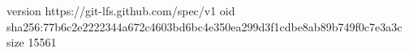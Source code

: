 version https://git-lfs.github.com/spec/v1
oid sha256:77b6c2e2222344a672c4603bd6bc4e350ea299d3f1cdbe8ab89b749f0c7e3a3c
size 15561
